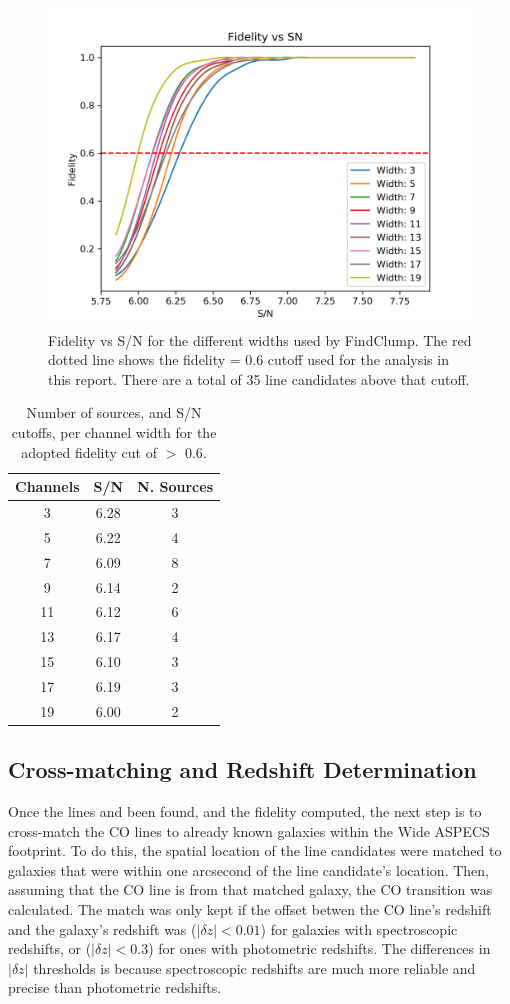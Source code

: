 \begin{figure}[!htbp]
\centering \includegraphics[width=120mm]{Fidelity_map.png}
\caption{Fidelity vs S/N for the different widths used by FindClump. The red dotted line shows the fidelity = 0.6 cutoff used for the analysis in this report. There are a total of 35 line candidates above that cutoff.}
\label{fig:Fid_map}
\end{figure}

\begin{table}
\centering
\caption{Number of sources, and S/N cutoffs, per channel width for the adopted fidelity cut of $>$ 0.6.}\label{table:Fid_NumTable}
\begin{tabular}{ccc}
Channels & S/N & N. Sources \\
\hline
3 & 6.28 & 3 \\
5 & 6.22 & 4 \\
7 & 6.09 & 8 \\
9 & 6.14 & 2 \\
11 & 6.12 & 6 \\
13 & 6.17 & 4 \\
15 & 6.10 & 3 \\
17 & 6.19 & 3 \\
19 & 6.00 & 2 \\
\end{tabular}
\end{table}

\subsection{Cross-matching and Redshift Determination}

Once the lines and been found, and the fidelity computed, the next step is to cross-match the CO lines to already known galaxies within the Wide ASPECS footprint. To do this, the spatial location of the line candidates were matched to galaxies that were within one arcsecond of the line candidate's location. Then, assuming that the CO line is from that matched galaxy, the CO transition was calculated. The match was only kept if the offset betwen the CO line's redshift and the galaxy's redshift was ($|\delta z| < 0.01$) for galaxies with spectroscopic redshifts, or ($|\delta z| < 0.3$) for ones with photometric redshifts. The differences in $|\delta z|$ thresholds is because spectroscopic redshifts are much more reliable and precise than photometric redshifts. 

